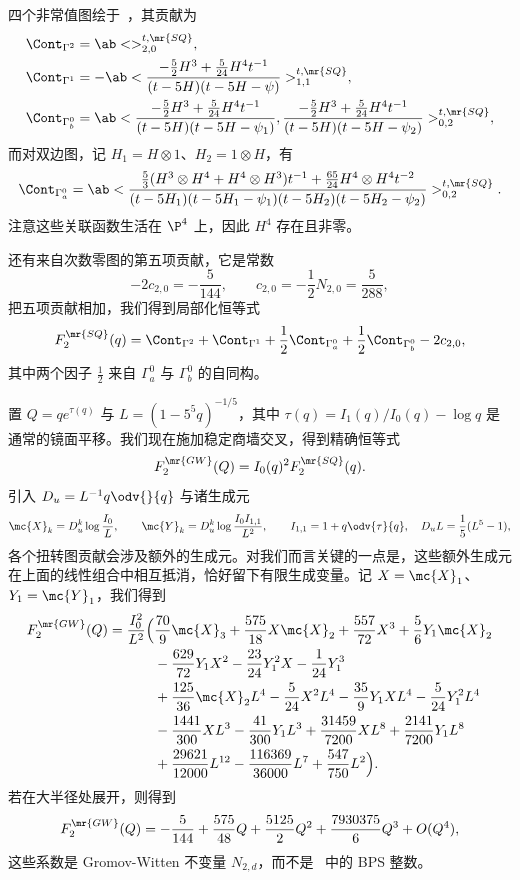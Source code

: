 四个非常值图绘于~，其贡献为
\begin{align*}
    \Cont_{\Gamma^2} &= \ab<>^{t,\mr{SQ}}_{2,0}, \\
    \Cont_{\Gamma^1} &= -\ab< \frac{-\frac{5}{2}H^3 + \frac{5}{24}H^4t^{-1}}{(t-5H)(t-5H-\psi)}>^{t,\mr{SQ}}_{1,1}, \\
    \Cont_{\Gamma_b^0} &= \ab< \frac{-\frac{5}{2}H^3+\frac{5}{24}H^4t^{-1}}{(t-5H)(t-5H-\psi_1)}, \frac{-\frac{5}{2}H^3+\frac{5}{24}H^4t^{-1}}{(t-5H)(t-5H-\psi_2)}>^{t,\mr{SQ}}_{0,2},
\end{align*}
而对双边图，记 \(H_1 = H \otimes 1\)、\(H_2 = 1 \otimes H\)，有
\[ \Cont_{\Gamma_a^0} = \ab< \frac{\frac{5}{3}(H^3\otimes H^4 + H^4 \otimes H^3)t^{-1} + \frac{65}{24}H^4 \otimes H^4 t^{-2}}{(t-5H_1)(t-5H_1-\psi_1)(t-5H_2)(t-5H_2-\psi_2)}>^{t,\mr{SQ}}_{0,2}. \]
注意这些关联函数生活在 \(\P^4\) 上，因此 \(H^4\) 存在且非零。

还有来自次数零图的第五项贡献，它是常数
\[ -2c_{2,0} = -\frac{5}{144}, \qquad c_{2,0} = -\frac{1}{2}N_{2,0} = \frac{5}{288}, \]
把五项贡献相加，我们得到局部化恒等式
\[ F_2^{\mr{SQ}}(q) = \Cont_{\Gamma^2} + \Cont_{\Gamma^1} + \frac{1}{2}\Cont_{\Gamma_a^0} + \frac{1}{2}\Cont_{\Gamma_b^0} - 2c_{2,0}, \]
其中两个因子 \(\frac{1}{2}\) 来自 \(\Gamma_a^0\) 与 \(\Gamma_b^0\) 的自同构。

置 \(Q = qe^{\tau(q)}\) 与 \(L = (1-5^5q)^{-1/5}\)，其中 \(\tau(q) = I_1(q)/I_0(q) - \log q\) 是通常的镜面平移。我们现在施加稳定商墙交叉，得到精确恒等式
\[ F_2^{\mr{GW}}(Q) = I_0(q)^2 F_2^{\mr{SQ}}(q). \]
引入 \(D_u = L^{-1}q\odv{}{q}\) 与诸生成元
\[ \mc{X}_k = D_u^k \log \frac{I_0}{L}, \qquad \mc{Y}_k = D_u^k \log \frac{I_0I_{1,1}}{L^2}, \qquad I_{1,1} = 1 + q \odv{\tau}{q}, \quad D_u L = \frac{1}{5}(L^5-1), \]
各个扭转图贡献会涉及额外的生成元。对我们而言关键的一点是，这些额外生成元在上面的线性组合中相互抵消，恰好留下有限生成变量。记 \(X = \mc{X}_1\)、\(Y_1 = \mc{Y}_1\)，我们得到
\begin{align*}
    F^{\mr{GW}}_2(Q) = \frac{I_0^2}{L^2}\Big(&\frac{70}{9}\mc{X}_3 + \frac{575}{18}X\mc{X}_2 + \frac{557}{72}X^3 + \frac{5}{6}Y_1\mc{X}_2 \\
    &- \frac{629}{72}Y_1X^2 - \frac{23}{24}Y_1^2 X - \frac{1}{24}Y_1^3 \\
    &+ \frac{125}{36}\mc{X}_2 L^4 - \frac{5}{24}X^2L^4 - \frac{35}{9}Y_1XL^4 - \frac{5}{24}Y_1^2L^4 \\
    &- \frac{1441}{300}XL^3 - \frac{41}{300}Y_1L^3 + \frac{31459}{7200}XL^8 + \frac{2141}{7200}Y_1L^8 \\
    &+ \frac{29621}{12000}L^{12} - \frac{116369}{36000}L^7 + \frac{547}{750}L^2\Big).
\end{align*}
若在大半径处展开，则得到
\[ F_2^{\mr{GW}}(Q) = -\frac{5}{144} + \frac{575}{48}Q + \frac{5125}{2}Q^2 + \frac{7930375}{6}Q^3 + O(Q^4), \]
这些系数是 Gromov-Witten 不变量 \(N_{2,d}\)，而不是~ 中的 BPS 整数。


